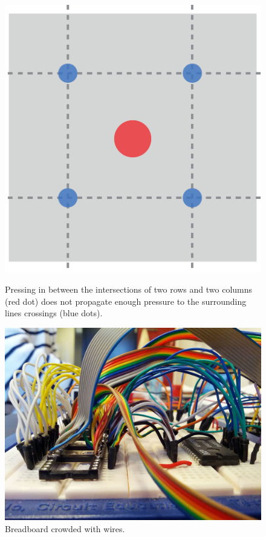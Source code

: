 \begin{figure}
\centering
\begin{minipage}[t]{.45\textwidth}
  \centering
  \includegraphics[width=.9\linewidth]{figures/touch/intersections}
  \caption[Pressing in between the intersection of two rows and two columns does not propagate enough pressure.]
  {Pressing in between the intersections of two rows and two columns (red dot) does not propagate enough pressure to the surrounding lines crossings (blue dots).}
  \label{fig:textiletouch:intersections}
\end{minipage}%
\hspace{1cm}
\begin{minipage}[t]{.45\textwidth}
  \centering
  \includegraphics[width=.9\linewidth]{figures/touch/wires}
  \caption[Breadboard crowded with wires.]
  {Breadboard crowded with wires.}
  \label{fig:textiletouch:wires}
\end{minipage}
\end{figure}

